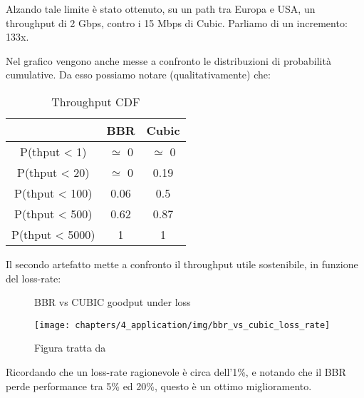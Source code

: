 Alzando tale limite è stato ottenuto, su un path tra Europa e USA, un throughput di 2 Gbps, contro i 15 Mbps di Cubic. Parliamo di un incremento: 133x. \bigskip

Nel grafico vengono anche messe a confronto le distribuzioni di probabilità cumulative. Da esso possiamo notare (qualitativamente) che:

\begin{table}[H]

\centering
\caption{Throughput CDF}	

\begin{tabular}{ccc}

\toprule
 & BBR & Cubic \\
\midrule
P(thput < 1) & $ \simeq $ 0 & $ \simeq $ 0 \\
\midrule
P(thput < 20) & $ \simeq $ 0 & 0.19  \\
\midrule
P(thput < 100) & 0.06 & 0.5 \\
\midrule
P(thput < 500) & 0.62 & 0.87  \\
\midrule
P(thput < 5000) & 1 & 1  \\
\bottomrule

\end{tabular}
\end{table}

Il secondo artefatto mette a confronto il throughput utile sostenibile, in funzione del loss-rate:

\begin{figure}[H]

\center
\caption{BBR vs CUBIC goodput under loss}
\texttt{[image: chapters/4\_application/img/bbr\_vs\_cubic\_loss\_rate]}
\caption*{Figura tratta da \cite[p.~65]{Cardwell:2017:BCC:3042068.3009824}}

\end{figure}

Ricordando che un loss-rate ragionevole è circa dell'1\%, e notando che il BBR perde performance tra 5\% ed 20\%, questo è un ottimo miglioramento.

